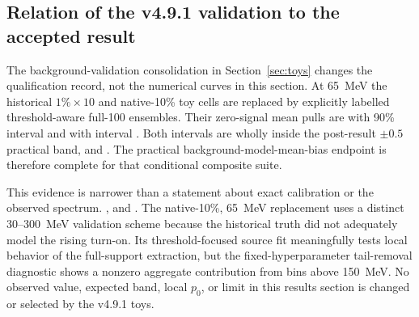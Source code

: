 \subsection{Relation of the v4.9.1 validation to the accepted result}
\label{sec:results-v491-validation-boundary}

The background-validation consolidation in Section~\ref{sec:toys} changes the
qualification record, not the numerical curves in this section.  At 65~MeV the
historical $1\%\times10$ and native-10\% toy cells are replaced by explicitly
labelled threshold-aware full-100 ensembles.  Their zero-signal mean pulls are
\VFourPNineOneOnePctMean{} with 90\% interval
\VFourPNineOneOnePctMeanCI{} and \VFourPNineOneNativeTenMean{} with interval
\VFourPNineOneNativeTenMeanCI.  Both intervals are wholly inside the post-result
$\pm0.5$ practical band, and \VFourPNineOneCompositeMeanState.  The practical
background-model-mean-bias endpoint is therefore complete for that conditional
composite suite.

This evidence is narrower than a statement about exact calibration or the
observed spectrum.  \VFourPNineOneWidthState, and
\VFourPNineOneResponseState.  The native-10\%, 65~MeV replacement uses a distinct
30--300~MeV validation scheme because the historical truth did not adequately model
the rising turn-on.  Its threshold-focused source fit meaningfully tests local
behavior of the full-support extraction, but the fixed-hyperparameter tail-removal
diagnostic shows a nonzero aggregate contribution from bins above 150~MeV.  No
observed value, expected band, local $p_0$, or limit in this results section is changed
or selected by the v4.9.1 toys.
